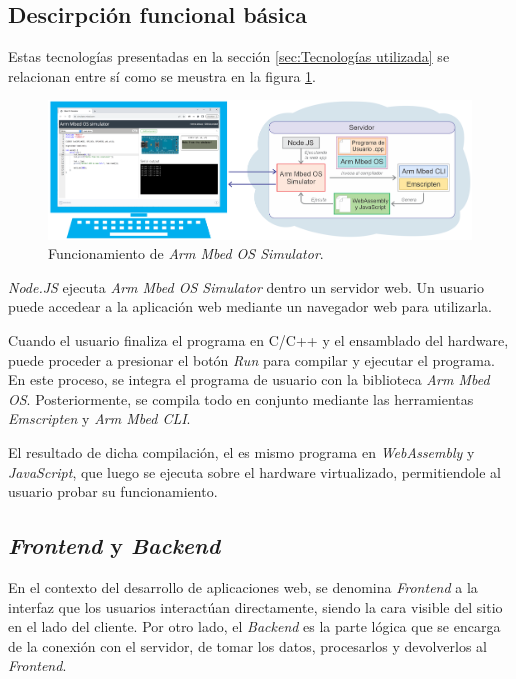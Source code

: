 \subsection{Descirpción funcional básica}

Estas tecnologías presentadas en la sección \ref{sec:Tecnologías utilizada} se relacionan entre sí como se meustra en la figura \ref{fig:AsiFuncionaMbedSim}.

\begin{figure}[ht]
	\centering
	\includegraphics[scale=.52]{./Figures/funcionamientoMbed.png}
	\caption{Funcionamiento de \textit{Arm Mbed OS Simulator}.}
	\label{fig:AsiFuncionaMbedSim}
\end{figure}

\textit{Node.JS} ejecuta \textit{Arm Mbed OS Simulator} dentro un servidor web. Un usuario puede accedear a la aplicación web mediante un navegador web para utilizarla. 

Cuando el usuario finaliza el programa en C/C++ y el ensamblado del hardware, puede proceder a presionar el botón \textit{Run} para compilar y ejecutar el programa. En este proceso, se integra el programa de usuario con la biblioteca \textit{Arm Mbed OS}. Posteriormente, se compila todo en conjunto mediante las herramientas \textit{Emscripten} y \textit{Arm Mbed CLI}.

El resultado de dicha compilación, el es mismo programa en \textit{WebAssembly} y \textit{JavaScript}, que luego se ejecuta sobre el hardware virtualizado, permitiendole al usuario probar su funcionamiento.

\subsection{\textit{Frontend} y \textit{Backend}}

En el contexto del desarrollo de aplicaciones web, se denomina \textit{Frontend} a la interfaz que los usuarios interactúan directamente, siendo la cara visible del sitio en el lado del cliente. Por otro lado, el \textit{Backend} es la parte lógica que se encarga de la conexión con el servidor, de tomar los datos, procesarlos y devolverlos al \textit{Frontend}.

